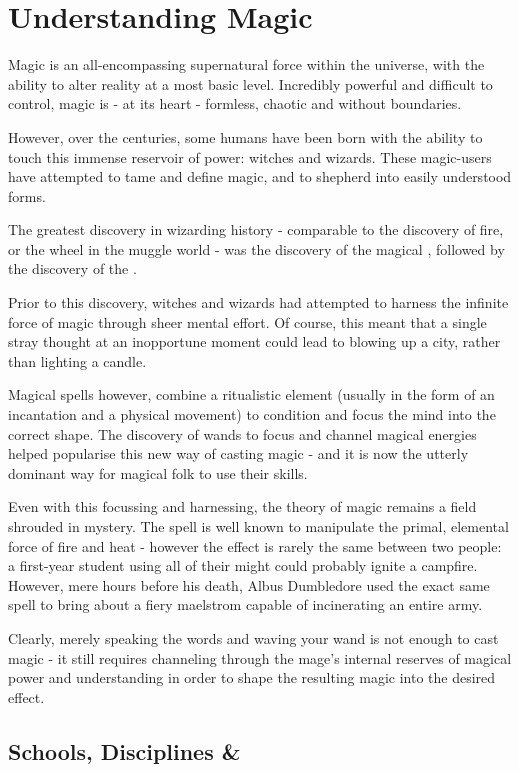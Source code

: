 
\chapter{Understanding Magic}

Magic is an all-encompassing supernatural force within the universe, with the ability to alter reality at a most basic level. Incredibly powerful and difficult to control, magic is - at its heart - formless, chaotic and without boundaries. 

However, over the centuries, some humans have been born with the ability to touch this immense reservoir of power: witches and wizards. These magic-users have attempted to tame and define magic, and to shepherd into easily understood forms. 

The greatest discovery in wizarding history - comparable to the discovery of fire, or the wheel in the muggle world - was the discovery of the magical , followed by the discovery of the . 

Prior to this discovery, witches and wizards had attempted to harness the infinite force of magic through sheer mental effort. Of course, this meant that a single stray thought at an inopportune moment could lead to blowing up a city, rather than lighting a candle. 

Magical spells however, combine a ritualistic element (usually in the form of an incantation and a physical movement) to condition and focus the mind into the correct shape. The discovery of wands to focus and channel magical energies helped popularise this new way of casting magic - and it is now the utterly dominant way for magical folk to use their skills.  

Even with this focussing and harnessing, the theory of magic remains a field shrouded in mystery. The spell  is well known to manipulate the primal, elemental force of fire and heat - however the effect is rarely the same between two people: a first-year student using all of their might could probably ignite a campfire. However, mere hours before his death, Albus Dumbledore used the exact same spell to bring about a fiery maelstrom capable of incinerating an entire army. 

Clearly, merely speaking the words and waving your wand is not enough to cast magic - it still requires channeling through the mage's internal reserves of magical power and understanding in order to shape the resulting magic into the desired effect. 


\section{Schools, Disciplines \& }\label{S:Schools}


